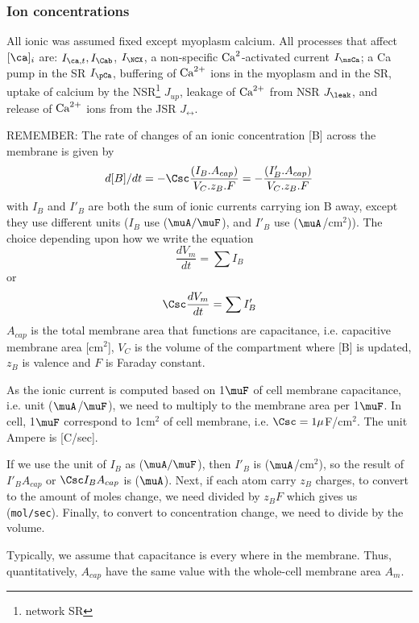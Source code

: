 \subsubsection{Ion concentrations}

All ionic was assumed fixed except myoplasm calcium.  All processes
that affect $[\ca]_i$ are: $I_{\ca,t}, I_\Cab$, $I_\NCX$, a
non-specific $\ce{Ca^2}$-activated current $I_\nsCa$; a Ca pump in
the SR $I_\pCa$, buffering of ${\text{Ca}^{2+}}$ ions in the myoplasm and
in the SR, uptake of calcium by the NSR\footnote{network SR} $J_{up}$,
leakage of ${\text{Ca}^{2+}}$ from NSR $J_\leak$, and release of ${\text{Ca}^{2+}}$
ions from the JSR $J_\rel$.

\begin{framed}
  REMEMBER: The rate of changes of an ionic concentration [B] across the
  membrane is given by
  \begin{equation}
    \label{eq:1253}
    d[B]/dt = -\Csc\frac{(I_B.A_{cap})}{V_C.z_B.F}=-\frac{(I_B'.A_{cap})}{V_C.z_B.F}
  \end{equation}
  with $I_B$ and $I'_B$ are both the sum of ionic currents carrying
  ion B away, except they use different units ($I_B$ use
  ($\muA/\muF$), and $I'_B$ use ($\muA$/cm$^2$)). The choice
  depending upon how we write the equation
  \begin{equation}
    \label{eq:1254}
    \frac{dV_m}{dt} = \sum I_B
  \end{equation}
  or
  \begin{equation}
    \label{eq:1255}
    \Csc \frac{dV_m}{dt} = \sum I'_B
  \end{equation}
  $A_{cap}$ is the total membrane area that functions are capacitance,
  i.e. capacitive membrane area [cm$^2$], $V_C$ is the volume of the
  compartment where [B] is updated, $z_B$ is valence and $F$ is
  Faraday constant.

  As the ionic current is computed based on 1$\muF$ of cell membrane
  capacitance, i.e. unit ($\muA$/$\muF$), we need to multiply to the
  membrane area per 1$\muF$.  In cell, 1$\muF$ correspond to 1cm$^2$
  of cell membrane, i.e. $\Csc=1\mu$F/cm$^2$.  The unit Ampere is
  [C/sec].

  If we use the unit of $I_B$ as ($\muA/\muF$), then $I'_B$ is
  ($\muA$/cm$^2$), so the result of $I'_BA_{cap}$ or $\Csc I_BA_{cap}$ is
  ($\muA$). Next, if each atom carry $z_B$ charges, to convert to the
  amount of moles change, we need divided by $z_BF$ which gives us
  (\verb!mol/sec!). Finally, to convert to concentration change, we
  need to divide by the volume.

  Typically, we assume that capacitance is every where in the
  membrane. Thus, quantitatively, $A_{cap}$ have the same value with the
  whole-cell membrane area $A_m$.
\end{framed}

